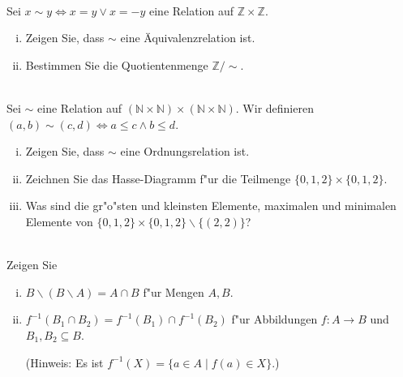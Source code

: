 \\
Sei $x\sim y\Leftrightarrow x=y \vee x=-y$ eine Relation auf $\mathbb{Z}\times\mathbb{Z}$. 
\begin{enumerate}[(i)]
    \item Zeigen Sie, dass $\sim$ eine Äquivalenzrelation ist.
    \item Bestimmen Sie die Quotientenmenge $\mathbb{Z}/\sim$.
\end{enumerate}

\\
Sei $\sim$ eine Relation auf $(\mathbb{N}\times\mathbb{N})\times(\mathbb{N}\times\mathbb{N})$. 
Wir definieren $(a,b)\sim(c,d)\Leftrightarrow a\leq c \wedge b\leq d$. 
\begin{enumerate}[(i)]
\item Zeigen Sie, dass $\sim$ eine Ordnungsrelation ist.
\item Zeichnen Sie das Hasse-Diagramm f"ur die Teilmenge $\{0,1,2\}\times\{0,1,2\}$.
\item Was sind die gr"o"sten und kleinsten Elemente, maximalen und minimalen Elemente von $\{0,1,2\}\times\{0,1,2\}\backslash\{(2,2)\}$?
\end{enumerate}

\\
Zeigen Sie
\begin{enumerate}[(i)]
    \item $B\backslash (B\backslash A)=A\cap B$ f"ur Mengen $A,B$.
    \item $f^{-1}(B_1\cap B_2)=f^{-1}(B_1)\cap f^{-1}(B_2)$ f"ur Abbildungen $f:A\to B$ und $B_1,B_2\subseteq B$. 
    
    (Hinweis: Es ist $f^{-1}(X)=\{a\in A\mid f(a)\in X\}$.)
\end{enumerate}
